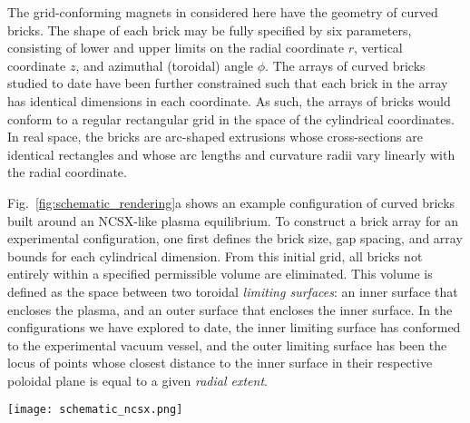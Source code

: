 \documentclass[11pt,onecolumn]{article}
\begin{document}
The grid-conforming magnets in considered here have the geometry of curved
bricks.
The shape of each brick may be fully specified by six parameters, 
consisting of lower and upper limits on the radial coordinate $r$, vertical 
coordinate $z$, and azimuthal (toroidal) angle $\phi$. The arrays of 
curved bricks studied to date have been further constrained such that each
brick in the array has identical dimensions in each coordinate. As such,
the arrays of bricks would conform to a regular rectangular grid in the space
of the cylindrical coordinates. In real space, the bricks are arc-shaped
extrusions whose cross-sections are identical rectangles and whose arc lengths
and curvature radii vary linearly with the radial coordinate.

Fig.~\ref{fig:schematic_rendering}a shows an example configuration of curved
bricks built around an NCSX-like plasma equilibrium.
To construct a brick array for an experimental configuration, one first
defines the brick size, gap spacing, and array bounds for each cylindrical 
dimension. From this initial grid, all bricks not entirely within a specified 
permissible volume are eliminated. This volume is defined as the space between 
two toroidal \textit{limiting surfaces}: an inner surface that encloses the 
plasma, and an outer surface that encloses the inner surface. In the 
configurations we have explored to date, the inner limiting surface has 
conformed to the experimental vacuum vessel, and the outer limiting surface has 
been the locus of points whose closest distance to the inner surface in their 
respective poloidal plane is equal to a given \textit{radial extent}.

\begin{figure*}
    \begin{center}
    \texttt{[image: schematic\_ncsx.png]}
    \caption{Renderings of arrays of (a) curved-brick magnets and 
             (b) hexahedral magnets designed for an NCSX-like plasma,
             viewed from the inboard side.
             The magnets, inner limiting surface (coincident with the vacuum 
             vessel in these cases), and the plasma boundary are shown for
             one half-period of the configuration, which has three field 
             periods in total. Both arrays have radial extents of 20 cm
             and are constructed on grids with 12 cells per half-period in
             the toroidal dimension. 
             }
    \label{fig:schematic_rendering}
    \end{center}
\end{figure*}
\end{document}
